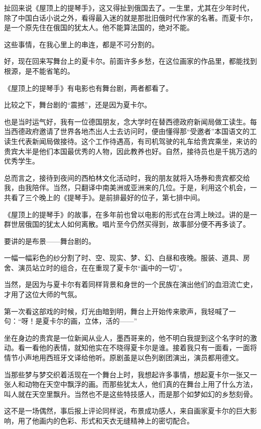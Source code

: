 \par 扯回来说《屋顶上的提琴手》，这又得扯到俄国去了。一生里，尤其在少年时代，除了中国白话小说之外，看得最入迷的就是那批旧俄时代作家的名著。而夏卡尔，是一个原先住在俄国的犹太人。他不能算法国的，绝对不能。
\par 这些事情，在我心里上的串连，都是不可分割的。
\par 好，现在回来写舞台上的夏卡尔。前面许多乡愁，在这位画家的作品里，都能找到根源，是不能省笔的。
\par 《屋顶上的提琴手》有电影也有舞台剧，两者都看了。
\par 比较之下，舞台剧的“震撼”，还是因为夏卡尔。
\par 也是当时运气好，我有一位德国朋友，念大学时在替西德政府新闻局做工读生。每当西德政府邀请了世界各地杰出人士去访问时，便由懂得那“受邀者”本国语文的工读生代表新闻局做接待。这个工作待遇高，有司机驾驶的礼车给贵宾乘坐，来访的贵宾大半是他们本国最优秀的人物，因此教养也好。自然，接待员也是千挑万选的优秀学生。
\par 总而言之，接待到夜间的西柏林文化活动时，我的朋友就将入场券和贵宾都交给我，由我陪伴。当然，只翻译中南美洲或亚洲来的几位。于是，利用这个机会，一共看了三个晚上的《提琴手》。是前排最好的位子，第七排中间。
\par 《屋顶上的提琴手》的故事，在多年前也曾以电影的形式在台湾上映过。讲的是一群世居俄国的犹太人如何离散。唱片至今仍然买得到，故事部分便不再多谈了。
\par 要讲的是布景——舞台剧的。
\par 一幅一幅彩色的纱分割了时、空、现实、梦、幻、白昼和夜晚。服装、道具、房舍、演员站立时的组合，在在重现了夏卡尔“画中的一切”。
\par 当然，是因为与夏卡尔有着同样背景和身世的一个民族在演出他们的血泪流亡史，才用了这位大师的气氛。
\par 第一次看这部戏的时候，灯光由暗到明，舞台上开始传来歌声，我轻喊了一句：“呀！是夏卡尔的画，立体，活的——”
\par 坐在身边的贵宾是一位新闻从业人，墨西哥来的，他不明白我提到这个名字时的激动。看一看他的表情，就知他实在不晓得夏卡尔是谁。接着我只有一面看，一面将情节小声地用西班牙文译给他听。原剧虽是以色列剧团演出，演员都用德文。
\par 当那些梦与梦交织着活现在一个舞台上时，我想起许多事情，想起夏卡尔一张又一张人和动物在天空中飘浮的画。而那些犹太人，他们真的在舞台上用了什么方法，叫人就在天空里飘升。当然也不是这些特技感人，而是那个如梦如幻的乡愁刻骨。
\par 这不是一场偶然，事后报上评论同样说，布景成功感人，来自画家夏卡尔的巨大影响，用了他画内的色彩、形式和天衣无缝精神上的密切配合。

